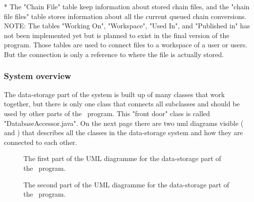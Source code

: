 * The "Chain File" table keep information about stored chain files, and the "chain file files" table stores information about all the current queued chain conversions.\\
NOTE: The tables "Working On", "Workspace", "Used In", and "Published in" has not been implemented yet but is planned to exist in the final version of the program. Those tables are used to connect files to a workspace of a user or users. But the connection is only a reference to where the file is actually stored. 

\subsubsection{System overview}
The data-storage part of the system is built up of many classes that work together, but there is only one class that connects all subclasses and should be used by other parts of the \appName\ program. This "front door" class is called "DatabaseAccessor.java". On the next page there are two uml diagrams visible ( and  ) that describes all the classes in the data-storage system and how they are connected to each other.

\FloatBarrier
\newpage
\begin{figure}[H]
\caption{The first part of the UML diagramme for the data-storage part of the \appName\ program.}
\label{fig:dat_umlPart1}
\end{figure}

\FloatBarrier

\newpage
\begin{figure}[H]
\caption{The second part of the UML diagramme for the data-storage part of the \appName\ program.}
\label{fig:dat_umlPart2}
\end{figure}

\FloatBarrier

\newpage
